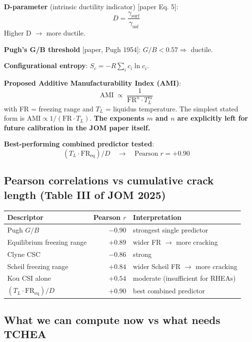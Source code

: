 \documentclass[11pt,a4paper]{article}
\begin{document}
\textbf{D-parameter} (intrinsic ductility indicator) [paper Eq. 5]:
\[
D = \frac{\gamma_{\text{surf}}}{\gamma_{\text{usf}}}
\]
Higher D $\rightarrow$ more ductile.

\textbf{Pugh's G/B threshold} [paper, Pugh 1954]: $G/B < 0.57 \Rightarrow$ ductile.

\textbf{Configurational entropy}: $S_c = -R \sum_i c_i \ln c_i$.

\textbf{Proposed Additive Manufacturability Index (AMI)}:
\[
\boxed{\text{AMI} \;\propto\; \frac{1}{\text{FR}^n \cdot T_L^m}}
\]
with FR = freezing range and $T_L$ = liquidus temperature. The simplest stated
form is $\text{AMI} \propto 1/(\text{FR} \cdot T_L)$. \textbf{The exponents $m$
and $n$ are explicitly left for future calibration in the JOM paper itself.}

\textbf{Best-performing combined predictor tested}:
\[
( T_L \cdot \text{FR}_{\text{eq}} ) / D \quad\rightarrow\quad \text{Pearson }r = +0.90
\]

\subsection{Pearson correlations vs cumulative crack length (Table III of JOM 2025)}

\begin{center}
\begin{tabular}{lrl}
\toprule
\textbf{Descriptor} & \textbf{Pearson $r$} & \textbf{Interpretation}\\
\midrule
\rowcolor{soft}Pugh $G/B$ & $\mathbf{-0.90}$ & strongest single predictor\\
Equilibrium freezing range & $+0.89$ & wider FR $\rightarrow$ more cracking\\
Clyne CSC & $-0.86$ & strong\\
Scheil freezing range & $+0.84$ & wider Scheil FR $\rightarrow$ more cracking\\
Kou CSI alone & $+0.54$ & moderate (insufficient for RHEAs)\\
$(T_L \cdot \text{FR}_{\text{eq}})/D$ & $+0.90$ & best combined predictor\\
\bottomrule
\end{tabular}
\end{center}

\subsection{What we can compute now vs what needs TCHEA}
\end{document}
